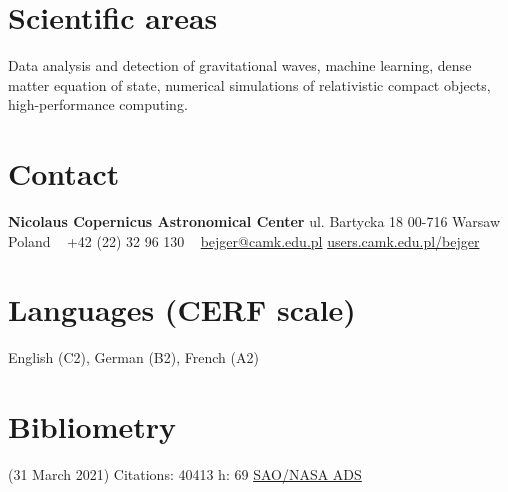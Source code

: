 \documentclass[]{friggeri-cv} %
\begin{document}


\begin{aside} %
\section{Scientific areas} 
Data analysis and detection of gravitational waves, machine learning, dense matter equation of state, numerical simulations of relativistic compact objects, high-performance computing.   
~
\section{Contact}
{\bf Nicolaus Copernicus Astronomical Center} 
ul. Bartycka 18
00-716 Warsaw 
Poland
~
+42 (22) 32 96 130
~
\href{mailto:bejger@camk.edu.pl}{bejger@camk.edu.pl}
\href{http://users.camk.edu.pl/bejger}{users.camk.edu.pl/bejger}
~
\section{Languages {\small (CERF scale)}}
English (C2), German (B2), French (A2)
\section{Bibliometry} 
{\small (31 March 2021)}
Citations: 40413
h: 69 
\href{https://ui.adsabs.harvard.edu/search/q=author\%3A\%22Bejger\%2C\%20M.\%22&sort=date\%20desc\%2C\%20bibcode\%20desc&p_=0}{SAO/NASA ADS}
\end{aside}
\end{document}
